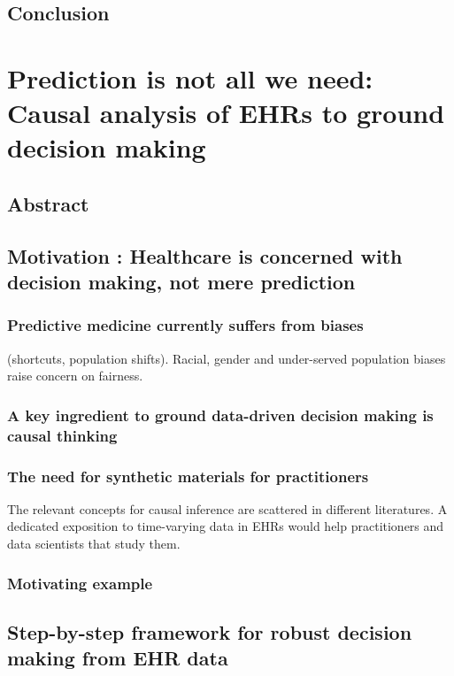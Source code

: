 \documentclass{report}
\begin{document}
\section{Conclusion}\label{sec:predictive_models:conclusion}

\chapter{Prediction is not all we need: Causal analysis of EHRs to ground decision making}\label{chapter:causal_tuto}
\section{Abstract}\label{sec:causal_tuto:abstract}

\section{Motivation : Healthcare is concerned with decision making, not mere prediction}\label{sec:causal_tuto:motivation}

\subsection{Predictive medicine currently suffers from biases}\label{subsec:causal_tuto:predictive_medicine_biases}
(shortcuts, population shifts). Racial, gender and under-served population biases raise concern on fairness.
\subsection{A key ingredient to ground data-driven decision making is causal thinking}

\subsection{The need for synthetic materials for practitioners}\label{subsec:causal_tuto:synthetic_materials}

The relevant concepts for causal inference are scattered in different literatures. A dedicated exposition to time-varying data in EHRs would help practitioners and data scientists that study them.
\subsection{Motivating example}\label{subsec:causal_tuto:motivating_example}


\section{Step-by-step framework for robust decision making from EHR data}\label{sec:causal_tuto:framework}
\end{document}
